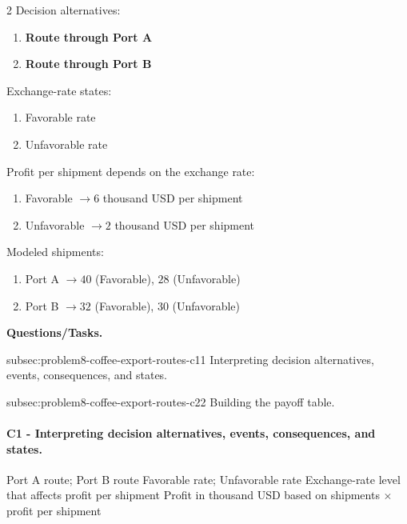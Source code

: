 	\begin{multicols}{2}
		Decision alternatives:
		\begin{enumerate}[label=\arabic*.]
			\item \textbf{Route through Port A}
			\item \textbf{Route through Port B}
		\end{enumerate}

		Exchange-rate states:
		\begin{enumerate}[label=\arabic*.]
			\item Favorable rate
			\item Unfavorable rate
		\end{enumerate}

			\columnbreak

		Profit per shipment depends on the exchange rate:
		\begin{enumerate}[label=\arabic*.]
			\item Favorable $\to 6$ thousand USD per shipment
			\item Unfavorable $\to 2$ thousand USD per shipment
		\end{enumerate}

		Modeled shipments:
		\begin{enumerate}[label=\arabic*.]
			\item Port A $\to 40$ (Favorable), $28$ (Unfavorable)
			\item Port B $\to 32$ (Favorable), $30$ (Unfavorable)
		\end{enumerate}
	\end{multicols}

	\textbf{Questions/Tasks.}
	\begin{enumerate}
		\CriterionTask
		{subsec:problem8-coffee-export-routes-c1}{1}
		{Interpreting decision alternatives, events, consequences, and states.}

		\CriterionTask
		{subsec:problem8-coffee-export-routes-c2}{2}
		{Building the payoff table.}
	\end{enumerate}

	\paragraph*{C1 - Interpreting decision alternatives, events, consequences, and states.}
	\label{subsec:problem8-coffee-export-routes-c1}
	\DecisionElementsTable
	{Port A route; Port B route}
	{Favorable rate; Unfavorable rate}
	{Exchange-rate level that affects profit per shipment}
	{Profit in thousand USD based on shipments $\times$ profit per shipment}

